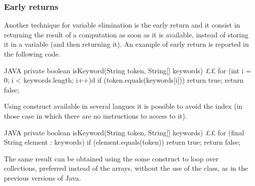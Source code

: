 \subsubsection{Early returns}

Another technique for variable elimination is the early return and it consist in returning the result of a computation
as soon as it is available, instead of storing it in a variable (and then returning it).
An example of early return is reported in the following code.
\begin{code}{JAVA}
private boolean isKeyword(String token, String[] keywords) {££
    for (int i = 0; i < keywords.length; i++)d
        if (token.equals(keywords[i]))
            return true;
    return false;
}
\end{code}

Using  construct available in several langues it is possible to
avoid the index (in those case in which there are no instructions to access to it).
\begin{code}{JAVA}
private boolean isKeyword(String token, String[] keywords) {££
    for (final String element : keywords)
        if (element.equals(token))
            return true;
    return false;
}
\end{code}
The same result can be obtained using the some construct to loop over collections,
preferred instead of the arrays, without the use of the  class, as
in the previous versions of Java.


